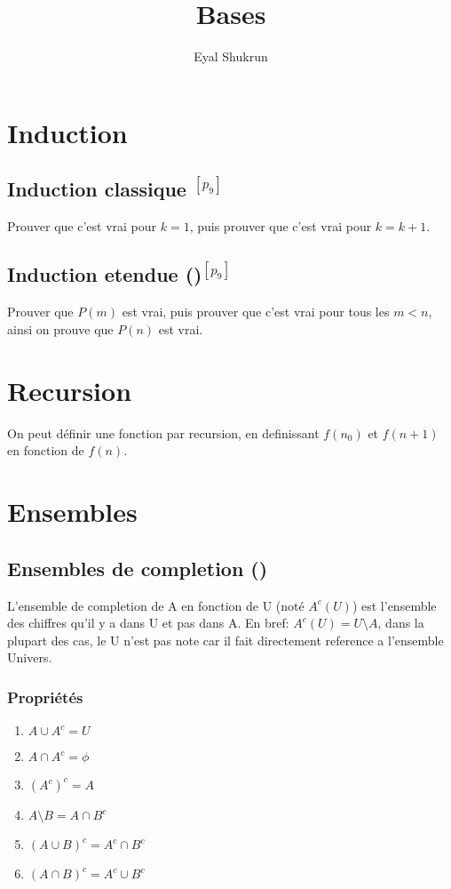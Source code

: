 \documentclass{article}
\title{Bases}
\author{Eyal Shukrun}
\begin{document}
\maketitle

\section{Induction}
\subsection{Induction classique $^{[p_9]}$}
Prouver que c'est vrai pour $k=1$, puis prouver que c'est vrai pour $k=k+1$.
\subsection{Induction etendue ()$^{[p_9]}$}
Prouver que $P(m)$ est vrai, puis prouver que c'est vrai pour tous les $m < n$, ainsi on prouve que  $P(n)$ est vrai.

\section{Recursion}
On peut définir une fonction par recursion, en definissant $f(n_0)$ et $f(n+1)$ en fonction de $f(n)$.

\section{Ensembles}

\subsection{Ensembles de completion ()}
L'ensemble de completion de A en fonction de U (noté $A^{c}(U)$) est l'ensemble des chiffres qu'il y a dans U et pas dans A. En bref: $A^{c}(U) = U \setminus A$, dans la plupart des cas, le U n'est pas note car il fait directement reference a l'ensemble Univers.

\subsubsection{Propriétés}
\begin{enumerate}
  \item $A \cup A^{c} = U$ 
  \item $A \cap A^{c} = \phi$ 
  \item $(A^{c})^{c} = A$ 
  \item $A \setminus B = A \cap B^{c}$
  \item $(A \cup B)^{c} = A^{c} \cap B^{c}$
  \item $(A \cap B)^{c} = A^{c} \cup B^{c}$
\end{enumerate}
  
\end{document}
